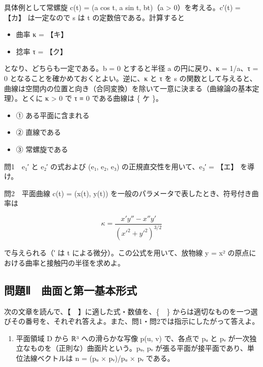 \documentclass[
  10pt,
  a4paper,
]{article}
\providecommand{\tightlist}{%
  \setlength{\itemsep}{0pt}\setlength{\parskip}{0pt}}
\begin{document}
具体例として常螺旋 c(t) = (a cos t, a sin t, bt)（a \textgreater{}
0）を考える。\textbar c′(t)\textbar{} = 【カ】 は一定なので s は t
の定数倍である。計算すると

\begin{itemize}
\tightlist
\item
  曲率 κ = 【キ】
\item
  捻率 τ = 【ク】
\end{itemize}

となり、どちらも一定である。b = 0 とすると半径 a の円に戻り、κ = 1/a、τ
= 0 となることを確かめておくとよい。逆に、κ と τ を s
の関数として与えると、曲線は空間内の位置と向き（合同変換）を除いて一意に決まる（曲線論の基本定理）。とくに
κ \textgreater{} 0 で τ ≡ 0 である曲線は \{ ケ \}。

\begin{itemize}
\tightlist
\item
  ① ある平面に含まれる
\item
  ② 直線である
\item
  ③ 常螺旋である
\end{itemize}

問1　e{\fallbackfont ₁}′ と e{\fallbackfont ₂}′ の式および
(e{\fallbackfont ₁}, e{\fallbackfont ₂}, e{\fallbackfont ₃})
の正規直交性を用いて、e{\fallbackfont ₃}′ = 【エ】 を導け。

問2　平面曲線 c(t) = (x(t), y(t))
を一般のパラメータで表したとき、符号付き曲率は

\[\kappa = \frac{x'y'' - x''y'}{(x'^2 + y'^2)^{3/2}}\]

で与えられる（′ は t による微分）。この公式を用いて、放物線 y = x²
の原点における曲率と接触円の半径を求めよ。

\hypertarget{ux554fux984cux2171-ux66f2ux9762ux3068ux7b2cux4e00ux57faux672cux5f62ux5f0f}{%
\subsection{問題Ⅱ　曲面と第一基本形式}\label{ux554fux984cux2171-ux66f2ux9762ux3068ux7b2cux4e00ux57faux672cux5f62ux5f0f}}

次の文章を読んで、【　】に適した式・数値を、\{　\}
からは適切なものを一つ選びその番号を、それぞれ答えよ。また、問1・問2では指示にしたがって答えよ。

\begin{enumerate}
\def\labelenumi{(\arabic{enumi})}
\tightlist
\item
  平面領域 D から {\fallbackfont ℝ}³ への滑らかな写像 p(u, v) で、各点で
  p{\fallbackfont ᵤ} と p{\fallbackfont ᵥ}
  が一次独立なものを（正則な）曲面片という。p{\fallbackfont ᵤ},
  p{\fallbackfont ᵥ} が張る平面が接平面であり、単位法線ベクトルは n =
  (p{\fallbackfont ᵤ} × p{\fallbackfont ᵥ})/\textbar p{\fallbackfont ᵤ}
  × p{\fallbackfont ᵥ}\textbar{} である。
\end{enumerate}
\end{document}

